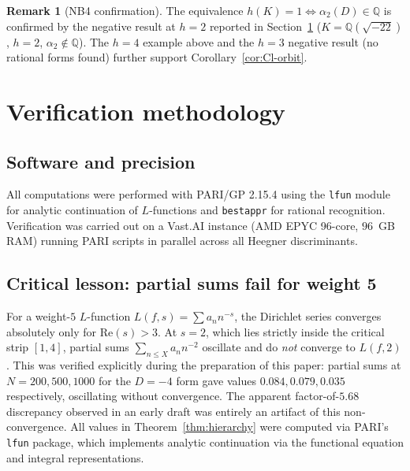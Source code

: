 \documentclass[12pt]{amsart}
\theoremstyle{definition}
\newtheorem{remark}[theorem]{Remark}
\newcommand{\Q}{\mathbb{Q}}
\begin{document}
\begin{remark}[NB4 confirmation]
  The equivalence $h(K) = 1 \Leftrightarrow \alpha_2(D) \in \Q$ is confirmed
  by the negative result at $h = 2$ reported in Section~\ref{sec:verify}
  ($K = \Q(\sqrt{-22})$, $h=2$, $\alpha_2 \notin \Q$).
  The $h=4$ example above and the $h=3$ negative result (no rational forms found)
  further support Corollary~\ref{cor:Cl-orbit}.
\end{remark}

\section{Verification methodology}
\label{sec:verify}

\subsection{Software and precision}

All computations were performed with PARI/GP 2.15.4 \cite{PARI215}
using the \texttt{lfun} module for analytic continuation of $L$-functions
and \texttt{bestappr} for rational recognition.
Verification was carried out on a Vast.AI instance (AMD EPYC 96-core, $96$~GB
RAM) running PARI scripts in parallel across all Heegner discriminants.

\subsection{Critical lesson: partial sums fail for weight 5}

For a weight-$5$ $L$-function $L(f,s) = \sum a_n n^{-s}$, the Dirichlet
series converges absolutely only for $\mathrm{Re}(s) > 3$.
At $s = 2$, which lies strictly inside the critical strip $[1,4]$, partial
sums $\sum_{n \leq X} a_n n^{-2}$ oscillate and do \emph{not} converge to
$L(f,2)$.
This was verified explicitly during the preparation of this paper:
partial sums at $N = 200, 500, 1000$ for the $D=-4$ form gave values
$0.084, 0.079, 0.035$ respectively, oscillating without convergence.
The apparent factor-of-$5.68$ discrepancy observed in an early draft was
entirely an artifact of this non-convergence.
All values in Theorem~\ref{thm:hierarchy} were computed via PARI's
\texttt{lfun} package, which implements analytic continuation via the
functional equation and integral representations.
\end{document}
